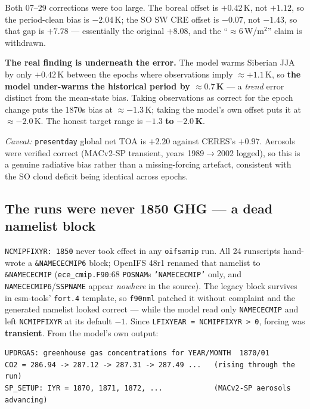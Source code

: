 \documentclass[10pt]{article}
\begin{document}
\noindent Both 07--29 corrections were too large. The boreal offset is $+0.42$\,K, not $+1.12$, so the
period-clean bias is $\mathbf{-2.04}$\,K; the SO SW CRE offset is $-0.07$, not $-1.43$, so that gap is
$\mathbf{+7.78}$ --- essentially the original $+8.08$, and the ``$\approx6$\,W/m$^2$'' claim is withdrawn.

\textbf{The real finding is underneath the error.} The model warms Siberian JJA by only $+0.42$\,K between the
epochs where observations imply $\approx+1.1$\,K, so \textbf{the model under-warms the historical period by
$\approx0.7$\,K} --- a \emph{trend} error distinct from the mean-state bias. Taking observations as correct for
the epoch change puts the 1870s bias at $\approx-1.3$\,K; taking the model's own offset puts it at
$\approx-2.0$\,K. The honest target range is $\mathbf{-1.3}$ \textbf{to} $\mathbf{-2.0}$\,\textbf{K}.

\emph{Caveat:} \texttt{presentday} global net TOA is $+2.20$ against CERES's $+0.97$. Aerosols were verified
correct (MACv2-SP transient, years 1989$\to$2002 logged), so this is a genuine radiative bias rather than a
missing-forcing artefact, consistent with the SO cloud deficit being identical across epochs.

\subsection{The runs were never 1850 GHG --- a dead namelist block}\label{sub:deadnml}
\texttt{NCMIPFIXYR: 1850} never took effect in any \texttt{oifsamip} run. All 24 runscripts hand-wrote a
\texttt{\&NAMECECMIP6} block; OpenIFS 48r1 renamed that namelist to \texttt{\&NAMECECMIP}
(\texttt{ece\_cmip.F90}:68 \texttt{POSNAM}s \texttt{'NAMECECMIP'} only, and \texttt{NAMECECMIP6}/\texttt{SSPNAME}
appear \emph{nowhere} in the source). The legacy block survives in esm-tools' \texttt{fort.4} template, so
\texttt{f90nml} patched it without complaint and the generated namelist looked correct --- while the model read
only \texttt{NAMECECMIP} and left \texttt{NCMIPFIXYR} at its default $-1$. Since
\texttt{LFIXYEAR = NCMIPFIXYR > 0}, forcing was \textbf{transient}. From the model's own output:

\begin{center}\footnotesize\begin{verbatim}
UPDRGAS: greenhouse gas concentrations for YEAR/MONTH  1870/01
CO2 = 286.94 -> 287.12 -> 287.31 -> 287.49 ...   (rising through the run)
SP_SETUP: IYR = 1870, 1871, 1872, ...            (MACv2-SP aerosols advancing)
\end{verbatim}\end{center}
\end{document}
